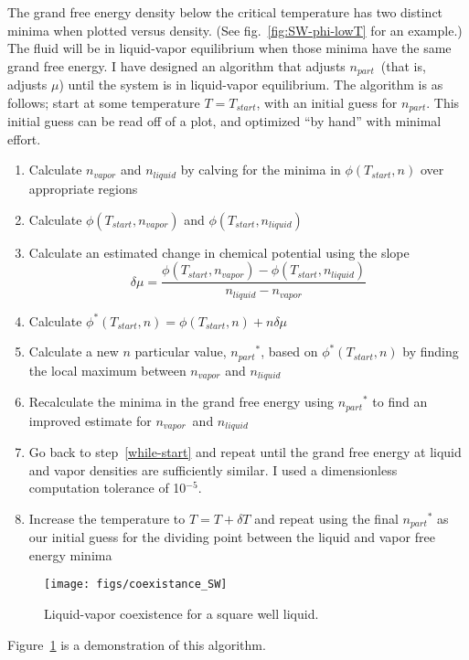 \documentclass[letterpaper,twocolumn,amsmath,amssymb,prb]{revtex4-1}
\newcommand{\npart}{\ensuremath{n_\textit{part}}}
\newcommand{\nliq}{\ensuremath{n_\textit{liquid}}}
\newcommand{\nvap}{\ensuremath{n_\textit{vapor}}}
\begin{document}
The grand free energy density below the critical temperature has two distinct minima when
plotted versus density. (See fig.~\ref{fig:SW-phi-lowT} for an
example.) The fluid will be in liquid-vapor equilibrium when those
minima have the same grand free energy. I have designed an algorithm
that adjusts \npart\ (that is, adjusts $\mu$) until the system is in
liquid-vapor equilibrium.  The algorithm is as follows; start at some
temperature $T=T_{start}$, with an initial guess for $\npart$. This
initial guess can be read off of a plot, and optimized ``by hand''
with minimal effort.
\begin{enumerate}
  \item Calculate $\nvap$ and $\nliq$ by calving for the minima in $\phi(T_{start},n)$ over appropriate regions
  \item Calculate $\phi(T_{start},\nvap)$ and $\phi(T_{start},\nliq)$ \label{while-start}
  \item Calculate an estimated change in chemical potential using the slope \[\delta\mu = \frac{\phi(T_{start},\nvap) - \phi(T_{start},\nliq)}{\nliq - \nvap}\]
  \item Calculate $\phi^*(T_{start},n) = \phi(T_{start},n) + n\delta\mu$
  \item Calculate a new $n$ particular value, $\npart^*$, based on $\phi^*(T_{start},n)$ by finding the local maximum between $\nvap$ and $\nliq$
  \item Recalculate the minima in the grand free energy using $\npart^*$ to find an improved estimate for \nvap\ and \nliq
  \item Go back to step~\ref{while-start} and repeat until the grand free energy at liquid and vapor densities are sufficiently similar. I used a dimensionless computation tolerance of 10$^{-5}$.
  \item Increase the temperature to $T = T + \delta T$ and repeat using the final $\npart^*$ as our initial guess for the dividing point between the liquid and vapor free energy minima
\end{enumerate}

\begin{figure}
  \begin{center}
  \texttt{[image: figs/coexistance\_SW]}
  \end{center}
  \caption{Liquid-vapor coexistence for a square well liquid.}
  \label{fig:coexistance_SW}
\end{figure}

Figure~\ref{fig:coexistance_SW} is a demonstration of this algorithm.
\end{document}
